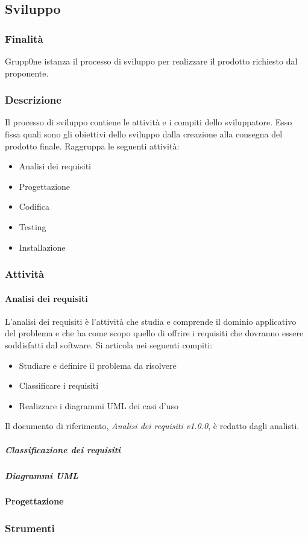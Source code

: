 \documentclass[../norme-di-progetto.tex]{subfiles}
\begin{document}
\subsection{Sviluppo}
\label{sub:sviluppo}
\subsubsection{Finalità}
\label{subs:finalità}
Grupp0ne istanza il processo di sviluppo per realizzare il prodotto richiesto dal proponente.
\subsubsection{Descrizione}
\label{subs:descrizione}
Il processo di sviluppo contiene le attività e i compiti dello sviluppatore. Esso fissa quali sono gli obiettivi dello sviluppo dalla creazione alla consegna del prodotto finale. Raggruppa le seguenti attività:
\begin{itemize}
	\item Analisi dei requisiti
	\item Progettazione
	\item Codifica
	\item Testing
	\item Installazione
\end{itemize}
\subsubsection{Attività}
\label{subs:attività}
\paragraph{Analisi dei requisiti}
\label{par:analisi dei requisiti}
L'analisi dei requisiti è l'attività che studia e comprende il dominio applicativo del problema e che ha come scopo quello di offrire i requisiti che dovranno essere soddisfatti dal software. Si articola nei seguenti compiti:
\begin{itemize}
	\item Studiare e definire il problema da risolvere
	\item Classificare i requisiti
	\item Realizzare i diagrammi UML dei casi d'uso
\end{itemize} 
Il documento di riferimento, \textit{Analisi dei requisiti v1.0.0}, è redatto dagli analisti.
\subparagraph{Classificazione dei requisiti}
\label{subp:classificazione dei requisiti}
\subparagraph{Diagrammi UML}
\label{subp:diagrammi UML}
\paragraph{Progettazione}
\label{par:progettazione}
\subsubsection{Strumenti}
\label{subs:strumenti}
\begin{comment}
inserire immagine di plantUML
\end{comment}
\end{document}
